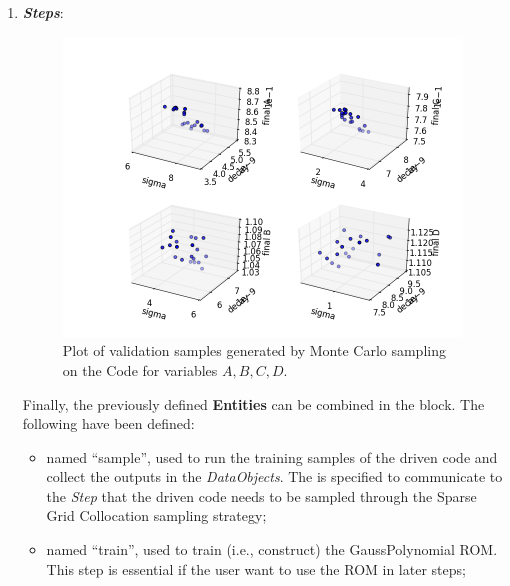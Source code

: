 \begin{enumerate}
\begin{itemize}
  \end{itemize}
   \item \textbf{\textit{Steps}}:
 \begin{figure}[h!]
  \centering
  \includegraphics[scale=0.7]{../../tests/framework/user_guide/ForwardSamplingStrategies/gold/RunDir/SparseGrid/1-samplesModelPlot3D_scatter-scatter-scatter-scatter.png}
  \caption{Plot of validation samples generated by Monte Carlo sampling on the Code for variables $A,B,C,D$.}
  \label{fig:samplesSparseGridPlotModel}
 \end{figure}
   Finally, the previously defined \textbf{Entities} can be combined in
   the  block.
   The following  have been defined:
   \begin{itemize}
     \item {} named ``sample'', used to run the training
     samples of the driven code and
     collect the outputs in the \textit{DataObjects}.
     The  is specified to communicate to the
     \textit{Step} that the driven code needs to
     be sampled through the Sparse Grid Collocation sampling strategy;
     \item {} named ``train'', used to train (i.e.,
     construct) the GaussPolynomial ROM. This step is essential if the
     user want to use the ROM in later steps;

\end{itemize}
\end{enumerate}
